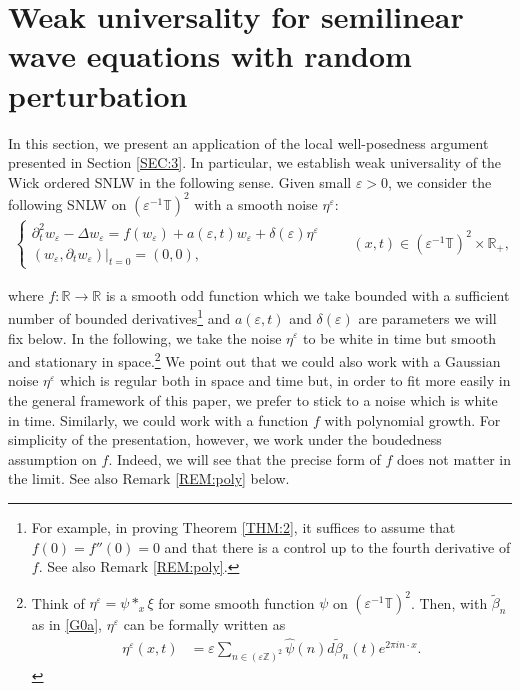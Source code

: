 \documentclass[letterpaper, 11pt,  reqno]{amsart}
\newcommand{\1}{\hspace{0.5mm}\text{I}\hspace{0.5mm}}
\newcommand{\noi}{\noindent}
\newcommand{\Z}{\mathbb{Z}}
\newcommand{\R}{\mathbb{R}}
\newcommand{\T}{\mathbb{T}}
\newcommand{\be}{\beta}
\newcommand{\Dl}{\Delta}
\newcommand{\eps}{\varepsilon}
\newcommand{\ft}{\widehat}
\newcommand{\wt}{\widetilde}
\newcommand{\dt}{\partial_t}
\numberwithin{equation}{section}
\numberwithin{theorem}{section}
\begin{document}
\section{Weak universality for semilinear wave equations with random
perturbation}
\label{SEC:4}

In this section, we present an application of the local well-posedness argument presented in Section \ref{SEC:3}.
In particular, 
we establish weak universality of the Wick ordered SNLW
in the following sense.
Given small $\eps > 0$, we consider the following  SNLW 
on $(\eps^{- 1} \T)^2$ 
with a smooth noise $\eta^\eps$:
\begin{align}
\begin{cases}
 \dt^2 w_\eps - \Dl w_\eps = f (w_\eps) + a (\eps, t) w_\eps + \delta   (\eps) \eta^\eps \\
 (w_\eps, \dt w_\eps) |_{t = 0}=  (0, 0),
\end{cases}
\qquad 
(x, t)\in (\eps^{- 1} \T)^2 \times \R_+, 
\label{SNLW11}
\end{align}


\noi
where 
 $f : \mathbb{R} \rightarrow
\mathbb{R}$ is a  smooth odd function which we take bounded with a sufficient
number of bounded derivatives\footnote{For example, in proving  Theorem \ref{THM:2}, 
it suffices to assume that $f(0) = f''(0) = 0$
and that there is a control up to the fourth derivative of $f$.
See also Remark \ref{REM:poly}.} 
and $a (\eps, t)$ and $\delta(\eps)$ are parameters we will fix below.
In the following, we take  the noise $\eta^\eps$ to be white in time but
smooth and stationary in space.\footnote{
Think of $\eta^\eps = \psi *_x \xi$ for some smooth function $\psi$ on $(\eps^{-1}\T)^2$.
Then, 
with $\wt \beta_n$ as in \eqref{G0a}, 
$\eta^\eps$ can be formally written  as 
\begin{align}
\eta^\eps(x, t) & 
=  \eps \sum_{n\in (\eps \Z)^{2}}
\ft \psi(n) d \wt \be_n (t) e^{2\pi i  n\cdot x} .
\label{MG0a}
\end{align}

}
 We point out that we could also work  with a Gaussian noise
$\eta^\eps$ which is regular both in space and time but, in order to fit more easily
in the general framework of this paper, we prefer to stick to a noise which is
white in time. 
Similarly,  we could work with a function $f$ with polynomial
growth.
For simplicity of the presentation, however, 
we work under the boudedness assumption on $f$.
 Indeed,  we will see that the precise form of $f$ does not matter in
the limit. 
See also Remark \ref{REM:poly} below.
\end{document}
